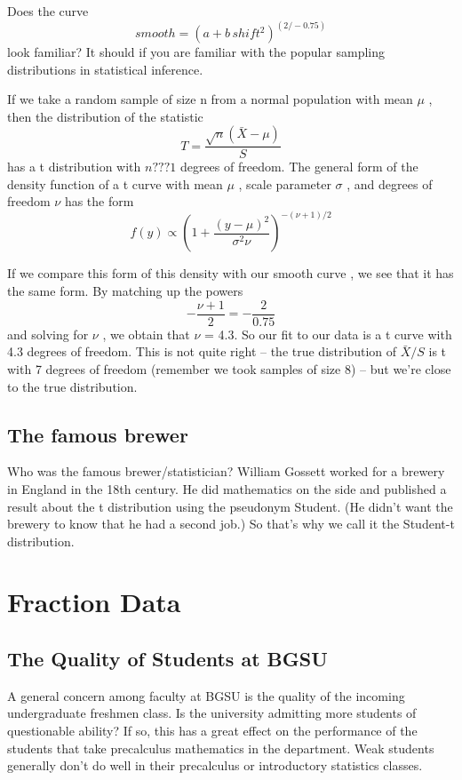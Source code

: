 \documentclass[
]{book}
\begin{document}
Does the curve
\[
smooth = (a + b \, shift ^ 2)^{(2/-0.75)}
\]
look familiar? It should if you are familiar with the popular sampling distributions in statistical inference.

If we take a random sample of size n from a normal population with mean \(\mu\) , then the distribution of the statistic
\[
T = \frac{\sqrt{n}(\bar X - \mu)}{S}
\]
has a t distribution with \(n ??? 1\) degrees of freedom. The general form of the density function of a t curve with mean \(\mu\) , scale parameter \(\sigma\) , and degrees of freedom \(\nu\) has the form
\[
f(y) \propto \left(1 + \frac{(y-\mu)^2}{\sigma^2 \nu}\right)^{-(\nu +1)/2}
\]

If we compare this form of this density with our smooth curve , we see that it has the same form. By matching up the powers
\[
- \frac{\nu + 1}{2} = -\frac{2}{0.75}
\]
and solving for \(\nu\) , we obtain that \(\nu\) = 4.3. So our fit to our data is a t curve with 4.3 degrees of freedom. This is not quite right -- the true distribution of \(\bar X / S\) is t with 7 degrees of freedom (remember we took samples of size 8) -- but we're close to the true distribution.

\hypertarget{the-famous-brewer}{%
\section{The famous brewer}\label{the-famous-brewer}}

Who was the famous brewer/statistician? William Gossett worked for a brewery in England in the 18th century. He did mathematics on the side and published a result about the t distribution using the pseudonym Student. (He didn't want the brewery to know that he had a second job.) So that's why we call it the Student-t distribution.

\hypertarget{fraction-data}{%
\chapter{Fraction Data}\label{fraction-data}}

\hypertarget{the-quality-of-students-at-bgsu}{%
\section{The Quality of Students at BGSU}\label{the-quality-of-students-at-bgsu}}

A general concern among faculty at BGSU is the quality of the incoming undergraduate freshmen class. Is the university admitting more students of questionable ability? If so, this has a great effect on the performance of the students that take precalculus mathematics in the department. Weak students generally don't do well in their precalculus or introductory statistics classes.
\end{document}
